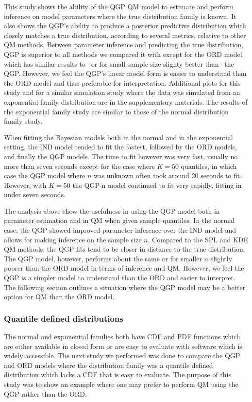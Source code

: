 This study shows the ability of the QGP QM model to estimate and perform 
inference on model parameters where the true distribution family is known. It 
also shows the QGP's ability to produce a posterior predictive distribution 
which closely matches a true distribution, according to several metrics, 
relative to other QM methods. Between parameter inference and predicting the 
true distribution, QGP is superior to all methods we compared it with except 
for the ORD model which has similar results to --or for small sample size
slighty better than-- the QGP. However, we feel the QGP's linear model form is
easier to understand than the ORD model and thus preferable for interpretation.
Additional plots for this study and for a similar simulation 
study where the data was simulated from an exponential family distribution are 
in the supplementary materials.
The results of the exponential family study are similar to those of the 
normal distribution family study.




When fitting the Bayesian models both in the normal and in the exponential 
setting, the IND model tended to fit the fastest, followed by the ORD models, 
and finally the QGP models. The time to fit however was very fast, usually no 
more than seven seconds except for the case where $K = 50$ quantiles, in which 
case the QGP model where $n$ was unknown often took around 20 seconds to fit. 
However, with $K= 50$ the QGP-n model continued to fit very rapidly, fitting in 
under seven seconds.

The analysis above show the usefulness in using the QGP model both in parameter 
estimation and in QM when given sample quantiles. In the normal case, the QGP 
showed improved parameter inference over the IND model and allows for making 
inference on the sample size $n$. Compared to the SPL and KDE QM methods, the 
QGP fits tend to be closer in distance to the true distribution. The QGP model, 
however, performs about the same or for smaller $n$ slightly poorer than the
ORD model in terms of inference and QM. However, we feel the QGP is a simpler
model to
understand than the ORD and easier to interpret.
The following section outlines a situation where the QGP model may be a better 
option for QM than the ORD model. 


\subsubsection{Quantile defined distributions}
The normal and exponential families both have CDF and PDF functions which are 
either available in closed form or are easy to evaluate with software which is 
widely accessible. The next study we performed was done to compare the QGP and 
ORD models where the distribution family was a quantile defined distribution 
which lacks a CDF that is easy to evaluate. The purpose of this study was to 
show an example where one may prefer to perform QM using the QGP rather than 
the ORD.


